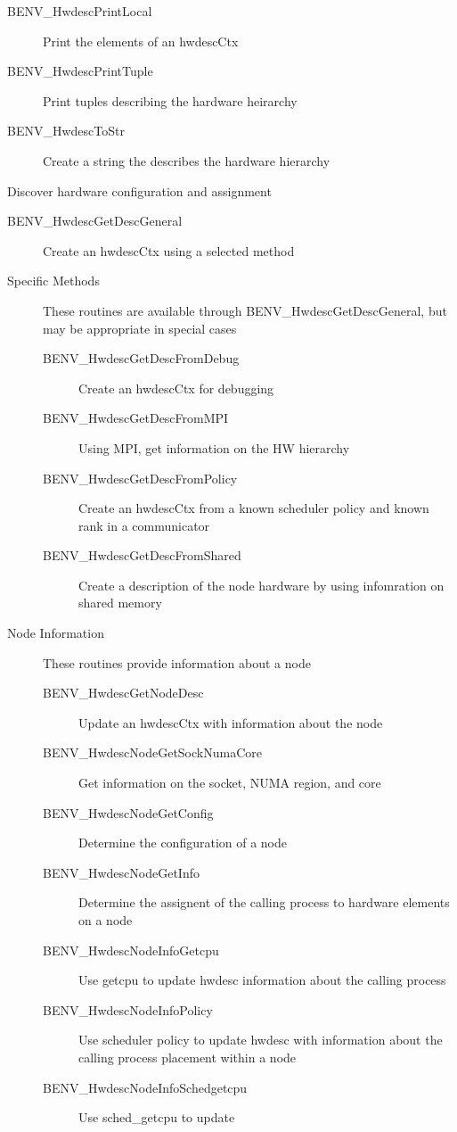 \documentclass[11pt,letterpaper]{report}
\begin{document}
\begin{description}
\begin{description}
 \item[BENV\_HwdescPrintLocal]Print the elements of an hwdescCtx
 \item[BENV\_HwdescPrintTuple]Print tuples describing the hardware heirarchy
 \item[BENV\_HwdescToStr]Create a string the describes the hardware hierarchy
 \end{description}
\item[Get Description]Discover hardware configuration and assignment
 \begin{description}
 \item[BENV\_HwdescGetDescGeneral]Create an hwdescCtx using a selected
  method
 \item[Specific Methods]These routines are available through
  BENV\_HwdescGetDescGeneral, but may be appropriate in special cases
  \begin{description}
  \item[BENV\_HwdescGetDescFromDebug]Create an hwdescCtx for debugging
  \item[BENV\_HwdescGetDescFromMPI]Using MPI, get information on the
    HW hierarchy
  \item[BENV\_HwdescGetDescFromPolicy]Create an hwdescCtx from a known
    scheduler policy and known rank in a communicator
  \item[BENV\_HwdescGetDescFromShared]Create a description of the node
    hardware by using infomration on shared memory
  \end{description}
 \item[Node Information]These routines provide information about a node
  \begin{description}
  \item[BENV\_HwdescGetNodeDesc]Update an hwdescCtx with information
    about the node
  \item[BENV\_HwdescNodeGetSockNumaCore]Get information on the socket,
    NUMA region, and core
  \item[BENV\_HwdescNodeGetConfig]Determine the configuration of a node
  \item[BENV\_HwdescNodeGetInfo]Determine the assignent of the calling
    process to hardware elements on a node
  \item[BENV\_HwdescNodeInfoGetcpu]Use getcpu to update hwdesc
    information about the calling process
  \item[BENV\_HwdescNodeInfoPolicy]Use scheduler policy to update hwdesc
    with information about the calling process placement within a node
  \item[BENV\_HwdescNodeInfoSchedgetcpu]Use sched\_getcpu to update

\end{description}
\end{description}
\end{description}
\end{document}

